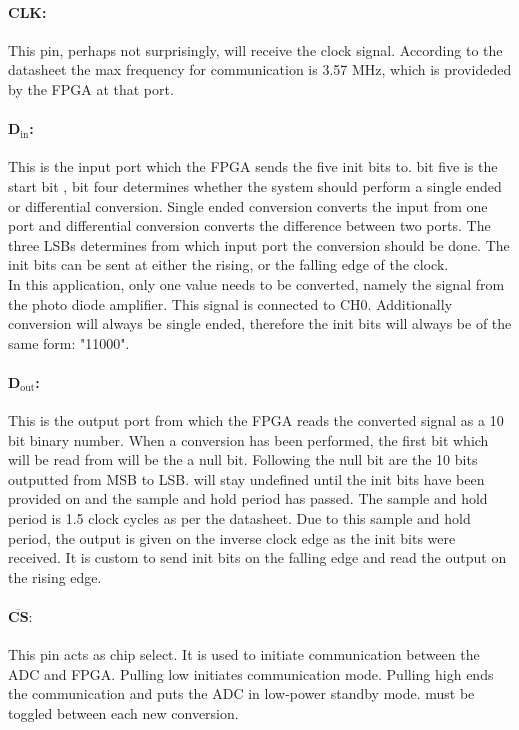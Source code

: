 \paragraph{CLK:}
This pin, perhaps not surprisingly, will receive the clock signal. According to the datasheet the max frequency for communication is 3.57 MHz, which is provideded by the FPGA at that port.

\paragraph{D$_\text{in}$:}
This is the input port which the FPGA sends the five init bits to. 
bit five is the start bit ,  bit four determines whether the system should perform a single ended or differential conversion. 
Single ended conversion converts the input from one port and differential conversion converts the difference between two ports. 
The three LSBs determines from which input port the conversion should be done.
The init bits can be sent at either the rising, or the falling edge of the clock.\\

In this application, only one value needs to be converted, namely the signal from the photo diode amplifier. 
This signal is connected to CH0.
Additionally conversion will always be single ended, therefore the init bits will always be of the same form: "11000".

\paragraph{D$_\text{out}$:}
This is the output port from which the FPGA reads the converted signal as a 10 bit binary number. 
When a conversion has been performed,  the first bit which will be read from \dout will be the a null bit.
Following the null bit are the 10 bits outputted from MSB to LSB. 
\dout will stay undefined until the init bits have been provided on \din and the sample and hold period has passed. 
The sample and hold period is 1.5 clock cycles as per the datasheet. 
Due to this sample and hold period, the output is given on the inverse clock edge as the init bits were received.
It is custom to send init bits on the falling edge and read the output on the rising edge.


\paragraph{$\overline{\textbf{CS}}:$}
This pin acts as chip select. It is used to initiate communication between the ADC and FPGA.
Pulling \cs low initiates communication mode. Pulling \cs high ends the communication and puts the ADC in low-power standby mode.  
\cs must be toggled between each new conversion. 
 
